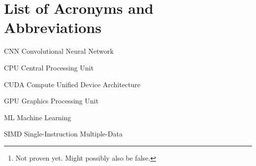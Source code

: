\documentclass[12pt,twoside]{article}
\begin{document}
\maketitle


\begin{abstract}
\label{sec:abstract}

We compare three dynamic memory allocators designed for running on GPUs and select the best performing under TensorFlow’s Convolutional Neural Network (CNN) benchmark, running the ResNet-50 and AlexNet models. The main metric of comparison is the number of images per second processed by the benchmark. Other metrics studied are: object sizes requested for allocation by the benchmark and the frequency in allocation request and in the sizes used. After our performance analysis, we conclude that \texttt{Halloc} algorithm is better than the already used algorithms by TensorFlow, \texttt{CUDAMalloc} and \texttt{BFCMalloc}, in the context of the benchmark itself.\footnote{Not proven yet. Might possibly also be false.}.

\textbf{Keywords:} Algorithm, Performance, Machine learning, GPU, Dynamic memory, Allocation, TensorFlow

\end{abstract}

\tableofcontents

\section*{List of Acronyms and Abbreviations}
\label{list-of-acronyms-and-abbreviations}

\begin{basedescript}{\desclabelstyle{\pushlabel}\desclabelwidth{10em}}
\item[CNN]					Convolutional Neural Network
\item[CPU]                  Central Processing Unit
\item[CUDA]                 Compute Unified Device Architecture
\item[GPU]                  Graphics Processing Unit
\item[ML]                   Machine Learning
\item[SIMD]                 Single-Instruction Multiple-Data
\end{basedescript}




\end{document}
